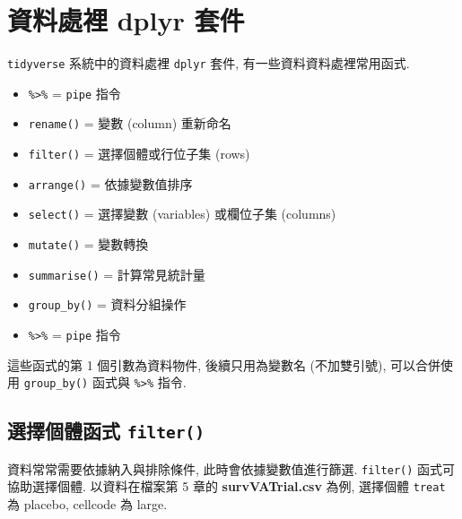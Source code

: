 \documentclass[
]{book}
\providecommand{\tightlist}{%
  \setlength{\itemsep}{0pt}\setlength{\parskip}{0pt}}
\begin{document}
\hypertarget{ux8cc7ux6599ux8655ux88e1-dplyr-ux5957ux4ef6}{%
\section{資料處裡 dplyr 套件}\label{ux8cc7ux6599ux8655ux88e1-dplyr-ux5957ux4ef6}}

\texttt{tidyverse} 系統中的資料處裡 \texttt{dplyr} 套件,
有一些資料資料處裡常用函式.

\begin{itemize}
\tightlist
\item
  \texttt{\%\textgreater{}\%} = \texttt{pipe} 指令
\item
  \texttt{rename()} = 變數 (column) 重新命名
\item
  \texttt{filter()} = 選擇個體或行位子集 (rows)
\item
  \texttt{arrange()} = 依據變數值排序
\item
  \texttt{select()} = 選擇變數 (variables) 或欄位子集 (columns)
\item
  \texttt{mutate()} = 變數轉換
\item
  \texttt{summarise()} = 計算常見統計量
\item
  \texttt{group\_by()} = 資料分組操作
\item
  \texttt{\%\textgreater{}\%} = \texttt{pipe} 指令
\end{itemize}

這些函式的第 1 個引數為資料物件,
後續只用為變數名 (不加雙引號),
可以合併使用 \texttt{group\_by()} 函式與 \texttt{\%\textgreater{}\%} 指令.

\hypertarget{ux9078ux64c7ux500bux9ad4ux51fdux5f0f-filter}{%
\subsection{\texorpdfstring{選擇個體函式 \texttt{filter()}}{選擇個體函式 filter()}}\label{ux9078ux64c7ux500bux9ad4ux51fdux5f0f-filter}}

資料常常需要依據納入與排除條件,
此時會依據變數值進行篩選.
\texttt{filter()} 函式可協助選擇個體.
以資料在檔案第 5 章的 \textbf{survVATrial.csv} 為例,
選擇個體 \texttt{treat} 為 placebo, cellcode 為 large.
\end{document}
